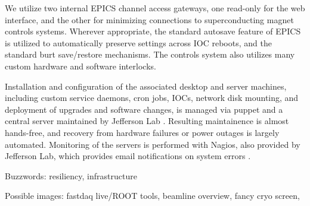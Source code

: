 We utilize two internal EPICS channel access gateways, one read-only for the web interface, and the other for minimizing connections to superconducting magnet controls systems.  Wherever appropriate, the standard autosave feature of EPICS is utilized to automatically preserve settings across IOC reboots, and the standard burt save/restore mechanisms.  The controls system also utilizes many custom hardware and software interlocks.

Installation and configuration of the associated desktop and server machines, including custom service daemons, cron jobs, IOCs, network disk mounting, and deployment of upgrades and software changes, is managed via puppet and a central server maintained by Jefferson Lab \cite{puppet-website}.  Resulting maintainence is almost hands-free, and recovery from hardware failures or power outages is largely automated.  Monitoring of the servers is performed with Nagios, also provided by Jefferson Lab, which provides email notifications on system errors \cite{nagios-website}.


Buzzwords:  resiliency, infrastructure

Possible images:  fastdaq live/ROOT tools, beamline overview, fancy cryo screen, 

